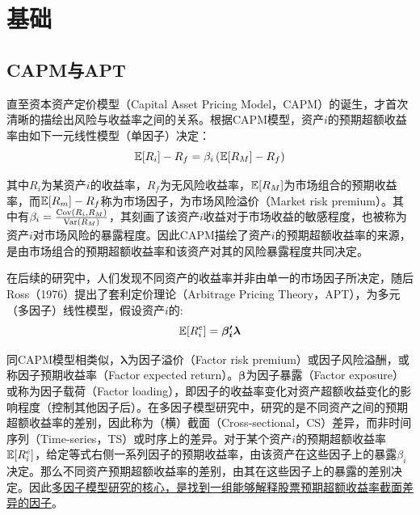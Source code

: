 \documentclass[11pt]{article}
\begin{document}
\maketitle
\tableofcontents

\section{基础}

\subsection{CAPM与APT}

直至资本资产定价模型（Capital Asset Pricing Model，CAPM）的诞生，才首次清晰的描绘出风险与收益率之间的关系。根据CAPM模型，资产$i$的预期超额收益率由如下一元线性模型（单因子）决定：
\begin{equation*}
    \mathbb{E}[R_i] - R_f = \beta_i \left( \mathbb{E}[R_M]-R_f \right)
\end{equation*}

其中$R_i$为某资产$i$的收益率，$R_f$为无风险收益率，$\mathbb{E}[R_M]$为市场组合的预期收益率，而$\mathbb{E}[R_m]- R_f$称为市场因子，为市场风险溢价（Market risk premium）。其中有$\beta_i = \frac{\operatorname{Cov}(R_i,R_M)}{\operatorname{Var}(R_M)}$，其刻画了该资产$i$收益对于市场收益的敏感程度，也被称为资产$i$对市场风险的暴露程度。因此CAPM描绘了资产$i$的预期超额收益率的来源，是由市场组合的预期超额收益率和该资产对其的风险暴露程度共同决定。

在后续的研究中，人们发现不同资产的收益率并非由单一的市场因子所决定，随后Ross（1976）提出了套利定价理论（Arbitrage Pricing Theory，APT），为多元（多因子）线性模型，假设资产$i$的:
\begin{equation*}
    \mathbb{E}[R_i^e] = \bm{\beta_{i}' \lambda}
\end{equation*}

同CAPM模型相类似，$\bm{\lambda}$为因子溢价（Factor risk premium）或因子风险溢酬，或称因子预期收益率（Factor expected return）。$\bm{\beta}$为因子暴露（Factor exposure）或称为因子载荷（Factor loading），即因子的收益率变化对资产超额收益变化的影响程度（控制其他因子后）。在多因子模型研究中，研究的是不同资产之间的预期超额收益率的差别，因此称为（横）截面（Cross-sectional，CS）差异，而非时间序列（Time-series，TS）或时序上的差异。对于某个资产$i$的预期超额收益率$\mathbb{E}[R_i^e]$，给定等式右侧一系列因子的预期收益率，由该资产在这些因子上的暴露$\beta_i$决定。那么不同资产预期超额收益率的差别，由其在这些因子上的暴露的差别决定。因此\uline{多因子模型研究的核心，是找到一组能够解释股票预期超额收益率截面差异的因子}。
\end{document}
